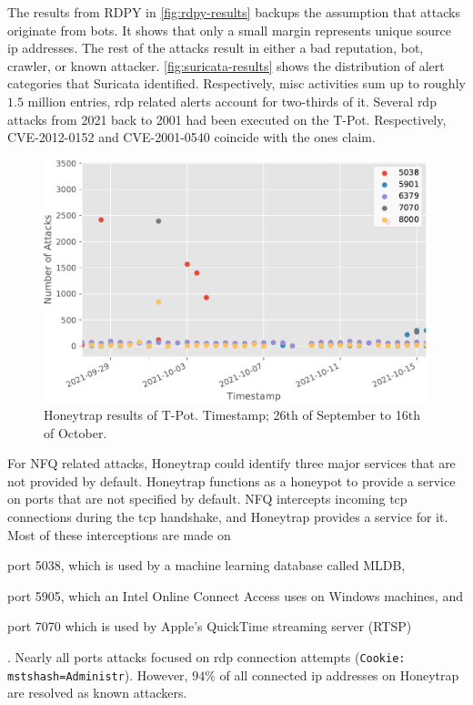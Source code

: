 The results from RDPY in \autoref{fig:rdpy-results} backups the assumption that attacks originate from bots.
It shows that only a small margin represents unique source \ac{ip} addresses.
The rest of the attacks result in either a bad reputation, bot, crawler, or known attacker.
\autoref{fig:suricata-results} shows the distribution of alert categories that Suricata identified.
Respectively, misc activities sum up to roughly $1.5$ million entries, \ac{rdp} related alerts account for two-thirds of it.
Several \ac{rdp} attacks from 2021 back to 2001 had been executed on the T-Pot.
Respectively, CVE-2012-0152 and CVE-2001-0540 coincide with the ones \citet{Kelly2021} claim.

\begin{figure}
    \centering
    \includegraphics[width=\textwidth]{figures/tpot-honeytrap-port.pdf}
    \caption[Honeytrap results of T-Pot]{
        Honeytrap results of T-Pot.
        Timestamp; 26th of September to 16th of October.
    }
    \label{fig:honeytrap-results}
\end{figure}

For NFQ related attacks, Honeytrap could identify three major services that are not provided by default.
Honeytrap functions as a honeypot to provide a service on ports that are not specified by default.
NFQ intercepts incoming \ac{tcp} connections during the \ac{tcp} handshake, and Honeytrap provides a service for it.
Most of these interceptions are made on
\begin{enumerate*}[label=(\roman*)]
    \item port 5038, which is used by a machine learning database called MLDB,
    \item port 5905, which an Intel Online Connect Access uses on Windows machines, and
    \item port 7070 which is used by Apple's QuickTime streaming server (RTSP)
\end{enumerate*}.
Nearly all ports attacks focused on \ac{rdp} connection attempts (\verb|Cookie: mstshash=Administr|).
However, $94\%$ of all connected \ac{ip} addresses on Honeytrap are resolved as known attackers.

